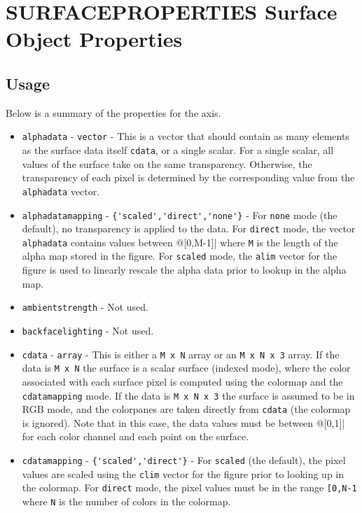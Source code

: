 \section{SURFACEPROPERTIES Surface Object Properties}

\subsection{Usage}

Below is a summary of the properties for the axis.
\begin{itemize}
\item  \verb|alphadata| - \verb|vector| - This is a vector that
 should contain as many elements as the surface data itself \verb|cdata|,
 or a single scalar.  For a single scalar, all values of the surface
 take on the same transparency.  Otherwise, the transparency of
 each pixel is determined by the corresponding value from the \verb|alphadata|
 vector.

\item  \verb|alphadatamapping| - \verb|{'scaled','direct','none'}| - For \verb|none|
 mode (the default), no transparency is applied to the data.  For \verb|direct|
 mode, the vector \verb|alphadata| contains values between @[0,M-1]| where
 \verb|M| is the length of the alpha map stored in the figure.  For \verb|scaled|
 mode, the \verb|alim| vector for the figure is used to linearly rescale the 
 alpha data prior to lookup in the alpha map. 

\item  \verb|ambientstrength| - Not used.

\item  \verb|backfacelighting| - Not used.

\item  \verb|cdata| - \verb|array| - This is either a \verb|M x N| array or an 
  \verb|M x N x 3| array.  If the data is \verb|M x N| the surface is a scalar
 surface (indexed mode), where the color associated with each surface pixel
 is computed using the colormap and the \verb|cdatamapping| mode.  If the
 data is \verb|M x N x 3| the surface is assumed to be in RGB mode, and the
 colorpanes are taken directly from \verb|cdata| (the colormap is ignored).
 Note that in this case, the data values must be between @[0,1]| for each
 color channel and each point on the surface.

\item  \verb|cdatamapping| - \verb|{'scaled','direct'}| - For \verb|scaled| (the
 default), the pixel values are scaled using the \verb|clim| vector for the
 figure prior to looking up in the colormap.  For \verb|direct| mode, the
 pixel values must be in the range \verb|[0,N-1| where \verb|N| is the number of
 colors in the colormap.


\end{itemize}
